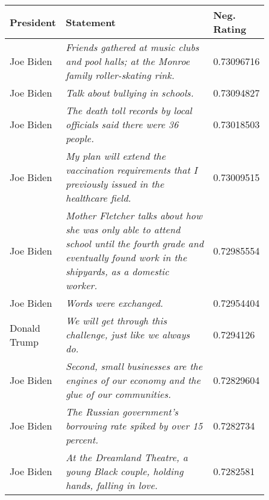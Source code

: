 \begin{table*}
\begin{tabular}{p{0.13\linewidth}p{0.72\linewidth}l}
President           & Statement & Neg. Rating \\ \hline
Joe Biden           & \textit{Friends gathered at music clubs and pool halls; at the Monroe family roller-skating rink.}                                                                   & 0.73096716 \\
Joe Biden           & \textit{Talk about bullying in schools.}                                                                                                                             & 0.73094827 \\
Joe Biden           & \textit{The death toll records by local officials said there were 36 people.}                                                                                        & 0.73018503 \\
Joe Biden           & \textit{My plan will extend the vaccination requirements that I previously issued in the healthcare field.}                                                          & 0.73009515 \\
Joe Biden           & \textit{Mother Fletcher talks about how she was only able to attend school until the fourth grade and eventually found work in the shipyards, as a domestic worker.} & 0.72985554 \\
Joe Biden           & \textit{Words were exchanged.}                                                                                                                                       & 0.72954404 \\
Donald Trump        & \textit{We will get through this challenge, just like we always do.}                                                                                                 & 0.7294126  \\
Joe Biden           & \textit{Second, small businesses are the engines of our economy and the glue of our communities.}                                                                    & 0.72829604 \\
Joe Biden           & \textit{The Russian government’s borrowing rate spiked by over 15 percent.}                                                                                          & 0.7282734  \\
Joe Biden           & \textit{At the Dreamland Theatre, a young Black couple, holding hands, falling in love.}                                                                             & 0.7282581  \\

\end{tabular}
\end{table*}
